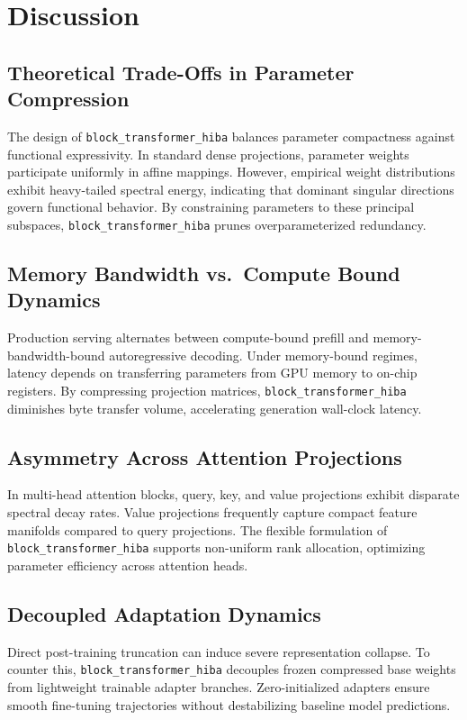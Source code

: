 \section{Discussion}

\subsection{Theoretical Trade-Offs in Parameter Compression}
The design of \texttt{block\_transformer\_hiba} balances parameter compactness against functional expressivity. In standard dense projections, parameter weights participate uniformly in affine mappings. However, empirical weight distributions exhibit heavy-tailed spectral energy, indicating that dominant singular directions govern functional behavior. By constraining parameters to these principal subspaces, \texttt{block\_transformer\_hiba} prunes overparameterized redundancy.

\subsection{Memory Bandwidth vs.\ Compute Bound Dynamics}
Production serving alternates between compute-bound prefill and memory-bandwidth-bound autoregressive decoding. Under memory-bound regimes, latency depends on transferring parameters from GPU memory to on-chip registers. By compressing projection matrices, \texttt{block\_transformer\_hiba} diminishes byte transfer volume, accelerating generation wall-clock latency.

\subsection{Asymmetry Across Attention Projections}
In multi-head attention blocks, query, key, and value projections exhibit disparate spectral decay rates. Value projections frequently capture compact feature manifolds compared to query projections. The flexible formulation of \texttt{block\_transformer\_hiba} supports non-uniform rank allocation, optimizing parameter efficiency across attention heads.

\subsection{Decoupled Adaptation Dynamics}
Direct post-training truncation can induce severe representation collapse. To counter this, \texttt{block\_transformer\_hiba} decouples frozen compressed base weights from lightweight trainable adapter branches. Zero-initialized adapters ensure smooth fine-tuning trajectories without destabilizing baseline model predictions.

